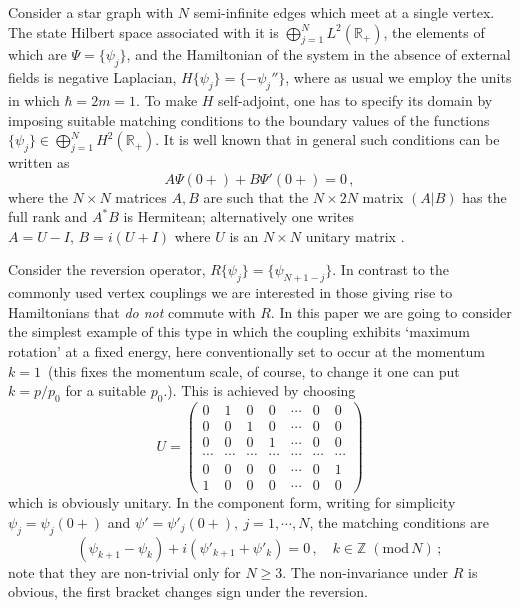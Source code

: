 \documentclass[english]{elsarticle}
\newcommand{\R}{\mathbb{R}}
\newcommand{\Z}{\mathbb{Z}}
\begin{document}
Consider a star graph with $N$ semi-infinite edges which meet at a single vertex. The state Hilbert space associated with it is $\bigoplus_{j=1}^N L^2(\R_+)$, the elements of which are $\Psi=\{\psi_j\}$, and the Hamiltonian of the system in the absence of external fields is negative Laplacian, $H\{\psi_j\} = \{-\psi_j''\}$, where as usual we employ the units in which $\hbar=2m=1$. To make $H$ self-adjoint, one has to specify its domain by imposing suitable matching conditions to the boundary values of the functions $\{\psi_j\} \in \bigoplus_{j=1}^N H^2(\R_+)$. It is well known \cite{KoS99} that in general such conditions can be written as
\begin{equation} \label{kschrader}
A\Psi(0+)+B\Psi'(0+)=0\,,
\end{equation}
where the $N\times N$ matrices $A,B$ are such that the $N\times 2N$
matrix $(A|B)$ has the full rank and $A^*B$ is Hermitean;
alternatively one writes $A=U-I,\, B=i(U+I)$ where $U$ is an
$N\times N$ unitary matrix \cite{GG91, Ha00}.

Consider the reversion operator, $R\{\psi_j\} =\{\psi_{N+1-j}\}$. In contrast to the commonly used vertex couplings we are interested in those giving rise to Hamiltonians that \emph{do not} commute with $R$. In this paper we are going to consider the simplest example of this type in which the coupling exhibits `maximum rotation' at a fixed energy, here conventionally set to occur at the momentum $k=1\,$ (this fixes the momentum scale, of course, to change it one can put $k=p/p_0$ for a suitable $p_0$.). This is achieved by choosing
$$
U= \left( \begin{array}{ccccccc}
0 & 1 & 0 & 0 & \cdots & 0 & 0 \\ 0 & 0 & 1 & 0 & \cdots & 0 & 0 \\ 0 & 0 & 0 & 1 & \cdots & 0 & 0 \\ \cdots & \cdots & \cdots & \cdots & \cdots & \cdots & \cdots \\ 0 & 0 & 0 & 0 & \cdots & 0 & 1 \\ 1 & 0 & 0 & 0 & \cdots & 0 & 0
\end{array} \right)
$$
which is obviously unitary. In the component form, writing for simplicity $\psi_j=\psi_j(0+)$ and $\psi'=\psi'_j(0+),\: j=1,\cdots,N$, the matching conditions are
\begin{equation} \label{vertex}
 (\psi_{k+1}-\psi_k) + i(\psi'_{k+1}+\psi'_k) = 0\,, \quad k\in\Z\; (\mathrm{mod}\,N)\,;
\end{equation}
note that they are non-trivial only for $N\ge 3$. The non-invariance under $R$ is obvious, the first bracket changes sign under the reversion.
\end{document}
